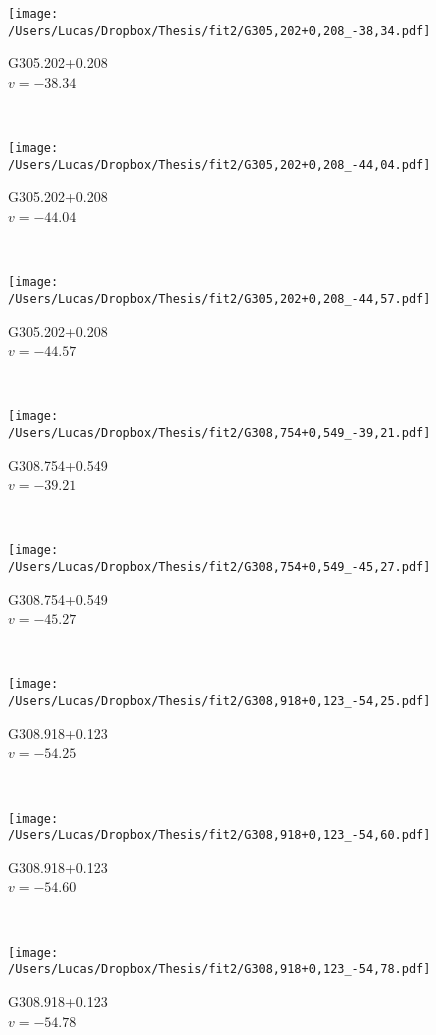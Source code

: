 \begin{figure*}[t]\ContinuedFloat
	\centering
	\begin{subfigure}[t]{0.3\textwidth}
		\texttt{[image: /Users/Lucas/Dropbox/Thesis/fit2/G305,202+0,208\_-38,34.pdf]}
		\caption[]{G305.202+0.208\\$v=-38.34$\,\kms}
	\end{subfigure}
	~
	\begin{subfigure}[t]{0.3\textwidth}
		\texttt{[image: /Users/Lucas/Dropbox/Thesis/fit2/G305,202+0,208\_-44,04.pdf]}
		\caption[]{G305.202+0.208\\$v=-44.04$\,\kms}
	\end{subfigure}
	~
	\begin{subfigure}[t]{0.3\textwidth}
		\texttt{[image: /Users/Lucas/Dropbox/Thesis/fit2/G305,202+0,208\_-44,57.pdf]}
		\caption[]{G305.202+0.208\\$v=-44.57$\,\kms}
	\end{subfigure}
	~
	\begin{subfigure}[t]{0.3\textwidth}
		\texttt{[image: /Users/Lucas/Dropbox/Thesis/fit2/G308,754+0,549\_-39,21.pdf]}
		\caption[]{G308.754+0.549\\$v=-39.21$\,\kms}
	\end{subfigure}
	~
	\begin{subfigure}[t]{0.3\textwidth}
		\texttt{[image: /Users/Lucas/Dropbox/Thesis/fit2/G308,754+0,549\_-45,27.pdf]}
		\caption[]{G308.754+0.549\\$v=-45.27$\,\kms}
	\end{subfigure}
	~
	\begin{subfigure}[t]{0.3\textwidth}
		\texttt{[image: /Users/Lucas/Dropbox/Thesis/fit2/G308,918+0,123\_-54,25.pdf]}
		\caption[]{G308.918+0.123\\$v=-54.25$\,\kms}
	\end{subfigure}
	~
	\begin{subfigure}[t]{0.3\textwidth}
		\texttt{[image: /Users/Lucas/Dropbox/Thesis/fit2/G308,918+0,123\_-54,60.pdf]}
		\caption[]{G308.918+0.123\\$v=-54.60$\,\kms}
	\end{subfigure}
	~
	\begin{subfigure}[t]{0.3\textwidth}
		\texttt{[image: /Users/Lucas/Dropbox/Thesis/fit2/G308,918+0,123\_-54,78.pdf]}
		\caption[]{G308.918+0.123\\$v=-54.78$\,\kms}

\end{subfigure}
\end{figure*}

